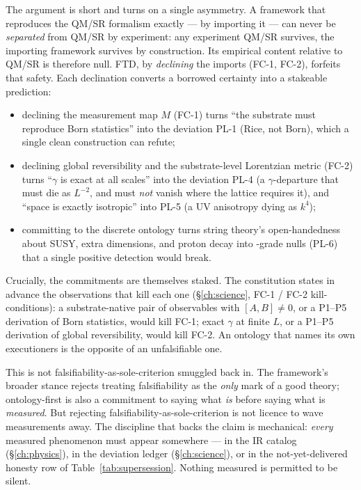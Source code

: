 The argument is short and turns on a single asymmetry. A framework that
reproduces the QM/SR formalism exactly --- by importing it --- can never be
\emph{separated} from QM/SR by experiment: any experiment QM/SR survives, the
importing framework survives by construction. Its empirical content relative to
QM/SR is therefore null. FTD, by \emph{declining} the imports (FC-1, FC-2),
forfeits that safety. Each declination converts a borrowed certainty into a
stakeable prediction:

\begin{itemize}[leftmargin=1.4em,itemsep=2pt,topsep=2pt]
  \item declining the measurement map $M$ (FC-1) turns ``the substrate must
    reproduce Born statistics'' into the deviation PL-1 (Rice, not Born), which
    a single clean construction can refute;
  \item declining global reversibility and the substrate-level Lorentzian metric
    (FC-2) turns ``$\gamma$ is exact at all scales'' into the deviation PL-4
    (a $\gamma$-departure that must die as $L^{-2}$, and must \emph{not} vanish
    where the lattice requires it), and ``space is exactly isotropic'' into PL-5
    (a UV anisotropy dying as $k^4$);
  \item committing to the discrete ontology turns string theory's
    open-handedness about SUSY, extra dimensions, and proton decay into
    -grade nulls (PL-6) that a single positive detection would break.
\end{itemize}

Crucially, the commitments are themselves staked. The constitution states in
advance the observations that kill each one (\S\ref{ch:science}, FC-1 / FC-2
kill-conditions): a substrate-native pair of observables with $[A,B] \neq 0$, or
a P1--P5 derivation of Born statistics, would kill FC-1; exact $\gamma$ at finite
$L$, or a P1--P5 derivation of global reversibility, would kill FC-2. An
ontology that names its own executioners is the opposite of an
unfalsifiable one.

This is not falsifiability-as-sole-criterion smuggled back in. The framework's
broader stance rejects treating falsifiability as the \emph{only} mark of a good
theory; ontology-first is also a commitment to saying what \emph{is} before
saying what is \emph{measured}. But rejecting falsifiability-as-sole-criterion
is not licence to wave measurements away. The discipline that backs the claim is
mechanical: \emph{every} measured phenomenon must appear somewhere --- in the IR
catalog (\S\ref{ch:physics}), in the deviation ledger (\S\ref{ch:science}), or
in the not-yet-delivered honesty row of Table~\ref{tab:supersession}. Nothing
measured is permitted to be silent.

